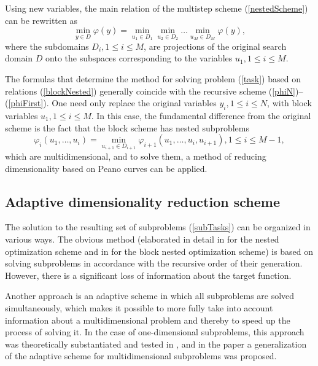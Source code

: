 \documentclass{svproc}
\begin{document}
Using new variables, the main relation of the multistep scheme (\ref{nestedScheme}) can be rewritten as
\begin{equation}
\label{blockNested}
\min_{y\in D} \varphi(y)=\min_{u_1\in D_1}\min_{u_2\in D_2}\dots\min_{u_M\in D_M}\varphi(y),
\end{equation}
where the subdomains  \(D_i,1\leqslant i\leqslant M\), are projections of the original search domain \(D\) onto the subspaces corresponding to the variables \(u_1,1\leqslant i\leqslant M\).

The formulas that determine the method for solving problem (\ref{task}) based on relations (\ref{blockNested}) generally coincide with the recursive scheme (\ref{phiN})--(\ref{phiFirst}). One need only replace the original variables  \(y_i,1\leqslant i\leqslant N\), with block variables  \(u_1,1\leqslant i\leqslant M\). 
In this case, the fundamental difference from the original scheme is the fact that the block scheme has nested subproblems
\begin{equation}
\label{subTasks}
\varphi_i(u_1,\dots,u_i)=\min_{u_{i+1}\in D_{i+1}}\varphi_{i+1}(u_1,\dots,u_i,u_{i+1}),1\leqslant i\leqslant M-1,
\end{equation}
which are multidimensional, and to solve them, a method of reducing dimensionality based on Peano curves can be applied.

\subsection{Adaptive dimensionality reduction scheme}

The solution to the resulting set of subproblems (\ref{subTasks}) can be organized in various ways.
The obvious method (elaborated in detail in \cite{Grishagin2015} for the nested optimization scheme and in \cite{Barkalov2014} for the block nested optimization scheme) is based on solving subproblems in accordance with the recursive order of their generation. However, there is a significant loss of information about the target function.

Another approach is an adaptive scheme in which all subproblems are solved simultaneously, which makes it possible to more fully take into account information about a multidimensional problem and thereby to speed up the process of solving it.
In the case of one-dimensional subproblems, this approach was theoretically substantiated and tested in \cite{Grishagin2016,Grishagin2018}, and in the paper \cite{Barkalov2020} a generalization of the adaptive scheme for multidimensional subproblems was proposed.
\end{document}
